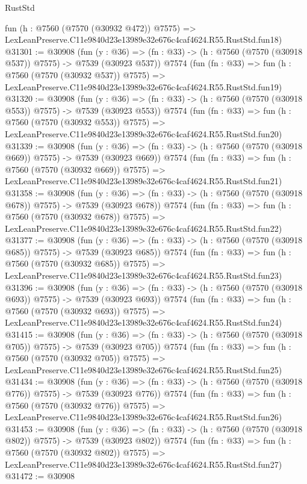 \begin{lexlean}{RustStd}
\begin{coremodule}
    fun (h : @7560 (@7570 (@30932 @472)) @7575) =>
    LexLeanPreserve.C11e9840d23e13989e32e676c4caf4624.R55.RustStd.fun18)
@31301 := @30908
    (fun (y : @36) => (fn : @33) -> (h : @7560 (@7570 (@30918 @537)) @7575) -> @7539 (@30923 @537))
    @7574
    (fun (fn : @33) =>
    fun (h : @7560 (@7570 (@30932 @537)) @7575) =>
    LexLeanPreserve.C11e9840d23e13989e32e676c4caf4624.R55.RustStd.fun19)
@31320 := @30908
    (fun (y : @36) => (fn : @33) -> (h : @7560 (@7570 (@30918 @553)) @7575) -> @7539 (@30923 @553))
    @7574
    (fun (fn : @33) =>
    fun (h : @7560 (@7570 (@30932 @553)) @7575) =>
    LexLeanPreserve.C11e9840d23e13989e32e676c4caf4624.R55.RustStd.fun20)
@31339 := @30908
    (fun (y : @36) => (fn : @33) -> (h : @7560 (@7570 (@30918 @669)) @7575) -> @7539 (@30923 @669))
    @7574
    (fun (fn : @33) =>
    fun (h : @7560 (@7570 (@30932 @669)) @7575) =>
    LexLeanPreserve.C11e9840d23e13989e32e676c4caf4624.R55.RustStd.fun21)
@31358 := @30908
    (fun (y : @36) => (fn : @33) -> (h : @7560 (@7570 (@30918 @678)) @7575) -> @7539 (@30923 @678))
    @7574
    (fun (fn : @33) =>
    fun (h : @7560 (@7570 (@30932 @678)) @7575) =>
    LexLeanPreserve.C11e9840d23e13989e32e676c4caf4624.R55.RustStd.fun22)
@31377 := @30908
    (fun (y : @36) => (fn : @33) -> (h : @7560 (@7570 (@30918 @685)) @7575) -> @7539 (@30923 @685))
    @7574
    (fun (fn : @33) =>
    fun (h : @7560 (@7570 (@30932 @685)) @7575) =>
    LexLeanPreserve.C11e9840d23e13989e32e676c4caf4624.R55.RustStd.fun23)
@31396 := @30908
    (fun (y : @36) => (fn : @33) -> (h : @7560 (@7570 (@30918 @693)) @7575) -> @7539 (@30923 @693))
    @7574
    (fun (fn : @33) =>
    fun (h : @7560 (@7570 (@30932 @693)) @7575) =>
    LexLeanPreserve.C11e9840d23e13989e32e676c4caf4624.R55.RustStd.fun24)
@31415 := @30908
    (fun (y : @36) => (fn : @33) -> (h : @7560 (@7570 (@30918 @705)) @7575) -> @7539 (@30923 @705))
    @7574
    (fun (fn : @33) =>
    fun (h : @7560 (@7570 (@30932 @705)) @7575) =>
    LexLeanPreserve.C11e9840d23e13989e32e676c4caf4624.R55.RustStd.fun25)
@31434 := @30908
    (fun (y : @36) => (fn : @33) -> (h : @7560 (@7570 (@30918 @776)) @7575) -> @7539 (@30923 @776))
    @7574
    (fun (fn : @33) =>
    fun (h : @7560 (@7570 (@30932 @776)) @7575) =>
    LexLeanPreserve.C11e9840d23e13989e32e676c4caf4624.R55.RustStd.fun26)
@31453 := @30908
    (fun (y : @36) => (fn : @33) -> (h : @7560 (@7570 (@30918 @802)) @7575) -> @7539 (@30923 @802))
    @7574
    (fun (fn : @33) =>
    fun (h : @7560 (@7570 (@30932 @802)) @7575) =>
    LexLeanPreserve.C11e9840d23e13989e32e676c4caf4624.R55.RustStd.fun27)
@31472 := @30908

\end{coremodule}
\end{lexlean}
